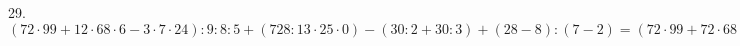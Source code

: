 29. $(72\cdot99+12\cdot68\cdot6-3\cdot7\cdot24):9:8:5+(728:13\cdot25\cdot0)-(30:2+30:3)+(28-8):(7-2)=(72\cdot99+72\cdot68-7\cdot72):(9\cdot8):5+0-(15+10)+20:5=
72\cdot(99+68-7):72:5-25+4=160:5-25+4=32-25+4=11.$\\
